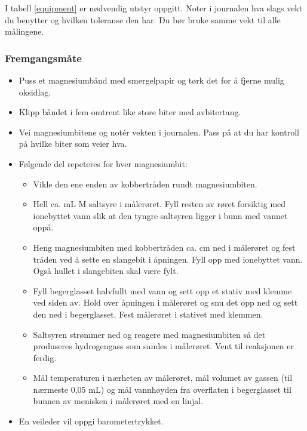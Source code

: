 \documentclass[12pt, a4]{article}
\begin{document}
	I tabell \ref{equipment} er nødvendig utstyr oppgitt.	Noter i journalen hva slags vekt du benytter og hvilken toleranse den har. Du bør bruke samme vekt til alle målingene.
	
	\subsubsection{Fremgangsmåte}
	\begin{itemize}
		\item Puss et magnesiumbånd med smergelpapir og tørk det for å fjerne mulig oksidlag.
		
		\item Klipp båndet i fem omtrent like store biter med avbitertang.
		
		\item Vei magnesiumbitene og notér vekten i journalen. Pass på at du har kontroll på hvilke biter som veier hva.
		
		\item Følgende del repeteres for hver magnesiumbit:
		\begin{itemize}
			\item Vikle den ene enden av kobbertråden rundt magnesiumbiten. 
			
			\item Hell ca. \unit[10]{mL} \unit[6]{M} saltsyre i målerøret. Fyll resten av røret forsiktig med ionebyttet vann slik at den tyngre saltsyren ligger i bunn med vannet oppå.
			
			\item Heng magnesiumbiten med kobbertråden ca. \unit[5]{cm} ned i målerøret og fest tråden ved å sette en slangebit i åpningen. Fyll opp med ionebyttet vann. Også hullet i slangebiten skal være fylt.
			
			\item Fyll begerglasset halvfullt med vann og sett opp et stativ med klemme ved siden av. Hold over åpningen i målerøret og snu det opp ned og sett den ned i begerglasset. Fest målerøret i stativet med klemmen.
			
			\item Saltsyren strømmer ned og reagere med magnesiumbiten så det produseres hydrogengass som samles i målerøret. Vent til reaksjonen er ferdig.
			
			\item Mål temperaturen i nærheten av målerøret, mål volumet av gassen (til nærmeste 0,05 mL) og mål vannhøyden fra overflaten i begerglasset til bunnen av menisken i målerøret med en linjal.
		\end{itemize}
		
		\item En veileder vil oppgi barometertrykket.
		
	\end{itemize}	
	
\end{document}
